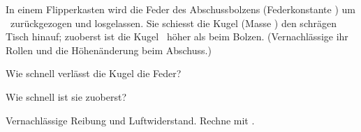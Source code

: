 In einem Flipperkasten wird die Feder des Abschussbolzens (Federkonstante \kO) um \sFO\ zurückgezogen und losgelassen. Sie schiesst die Kugel (Masse \mO) den schrägen Tisch hinauf; zuoberst ist die Kugel \hTO\ höher als beim Bolzen. (Vernachlässige ihr Rollen und die Höhenänderung beim Abschuss.)

\begin{abcliste}
\abc
Wie schnell verlässt die Kugel die Feder?

\abc
Wie schnell ist sie zuoberst?
\end{abcliste}

Vernachlässige Reibung und Luftwiderstand. Rechne mit \gO.

